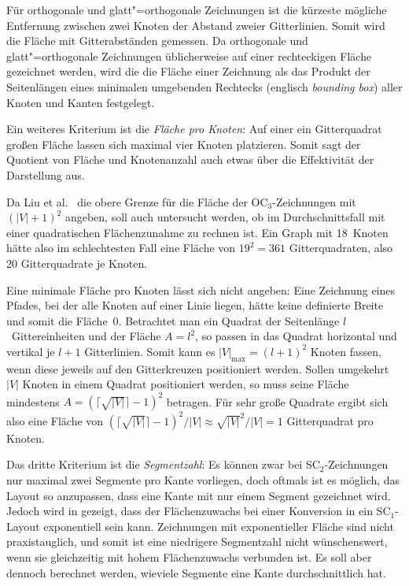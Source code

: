 \documentclass[a4paper]{scrreprt}
\theoremstyle{definition}
\begin{document}
Für orthogonale und glatt"=orthogonale Zeichnungen ist die kürzeste mögliche Entfernung zwischen zwei Knoten der Abstand zweier Gitterlinien. Somit wird die Fläche mit Gitterabständen gemessen. Da orthogonale und glatt"=orthogonale Zeichnungen üblicherweise auf einer rechteckigen Fläche gezeichnet werden, wird die die Fläche einer Zeichnung als das Produkt der Seitenlängen eines minimalen umgebenden Rechtecks (englisch \emph{bounding box}) aller Knoten und Kanten festgelegt.

Ein weiteres Kriterium ist die \emph{Fläche pro Knoten}: Auf einer ein Gitterquadrat großen Fläche lassen sich maximal vier Knoten platzieren. Somit sagt der Quotient von Fläche und Knotenanzahl auch etwas über die Effektivität der Darstellung aus.

Da Liu et al.~\cite{liu+etal-98} die obere Grenze für die Fläche der OC$_3$-Zeichnungen mit $(|V|+1)^2$ angeben, soll auch untersucht werden, ob im Durchschnittsfall mit einer quadratischen Flächenzunahme zu rechnen ist. Ein Graph mit 18~Knoten hätte also im schlechtesten Fall eine Fläche von $19^2 = 361$ Gitterquadraten, also 20 Gitterquadrate je Knoten.

Eine minimale Fläche pro Knoten lässt sich nicht angeben: Eine Zeichnung eines Pfades, bei der alle Knoten auf einer Linie liegen, hätte keine definierte Breite und somit die Fläche~0. Betrachtet man ein Quadrat der Seitenlänge $l$~Gittereinheiten und der Fläche $A = l^2$, so passen in das Quadrat horizontal und vertikal je $l+1$ Gitterlinien. Somit kann es $|V|_\text{max} = (l + 1)^2$ Knoten fassen, wenn diese jeweils auf den Gitterkreuzen positioniert werden. Sollen umgekehrt $|V|$ Knoten in einem Quadrat positioniert werden, so muss seine Fläche mindestens $A = (\lceil\sqrt{|V|}\rceil - 1)^2$ betragen. Für sehr große Quadrate ergibt sich also eine Fläche von $(\lceil\sqrt{|V|}\rceil - 1)^2 /|V| \approx \sqrt{|V|}^2 / |V|  = 1$ Gitterquadrat pro Knoten. 

Das dritte Kriterium ist die \emph{Segmentzahl}: Es können zwar bei SC$_2$-Zeichnungen nur maximal zwei Segmente pro Kante vorliegen, doch oftmals ist es möglich, das Layout so anzupassen, dass eine Kante mit nur einem Segment gezeichnet wird.  Jedoch wird in \cite{bekos-13} gezeigt, dass der Flächenzuwachs bei einer Konversion in ein SC$_1$-Layout exponentiell sein kann. Zeichnungen mit exponentieller Fläche sind nicht praxistauglich, und somit ist eine niedrigere Segmentzahl nicht wünschenswert, wenn sie gleichzeitig mit hohem Flächenzuwachs verbunden ist. Es soll aber dennoch berechnet werden, wieviele Segmente eine Kante durchschnittlich hat.
\end{document}
